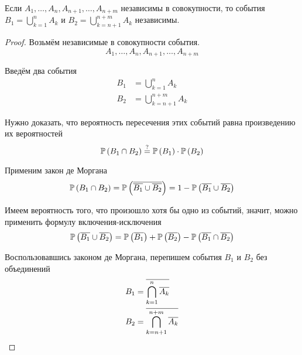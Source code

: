 \begin{affirmation}
    Если $A_1, \dots, A_n, A_{n+1}, \dots, A_{n+m}$ независимы в совокупности,
    то события
    $B_1=\bigcup_{k=1}^n A_k$ и $B_2=\bigcup_{k=n+1}^{n+m} A_k$ независимы.
\end{affirmation}
\begin{proof}
    Возьмём независимые в совокупности события.
    $$A_1, \dots, A_n, A_{n+1}, \dots, A_{n+m}$$
    
    Введём два события
    \begin{align*}
    B_1&=\bigcup_{k=1}^n A_k\\
    B_2&=\bigcup_{k=n+1}^{n+m} A_k
    \end{align*}

    Нужно доказать, что вероятность пересечения этих событий
    равна произведению их вероятностей
    \begin{equation}\label{eq:main_unions}
    \mathbb{P}\left( B_1\cap B_2 \right)
        \stackrel{\rm ?}{=}\mathbb{P}\left( B_1 \right)\cdot\mathbb{P}\left( B_2 \right)
    \end{equation}

    Применим закон де Моргана
    \begin{equation}\label{eq:de_morgan_result}
    \mathbb{P}\left( B_1\cap B_2 \right)
    =\mathbb{P}\left( \overline{\overline{B_1}\cup \overline{B_2}} \right)
    =1-\mathbb{P}\left( {\overline{B_1}\cup \overline{B_2}} \right)
    \end{equation}

    Имеем вероятность того, что произошло хотя бы одно из событий,
    значит, можно применить формулу включения-исключения
    \begin{equation}\label{eq:incl_excl_result}
    \mathbb{P}\left( \overline{B_1}\cup \overline{B_2} \right)
    =\mathbb{P}\left( \overline{B_1} \right)+\mathbb{P}\left( \overline{B_2} \right)
        -\mathbb{P}\left( \overline{B_1}\cap \overline{B_2} \right)
    \end{equation}

    Воспользовавшись законом де Моргана,
    перепишем события $B_1$ и $B_2$ без объединений
    \begin{align*}
    B_1&=\overline{\bigcap_{k=1}^n \overline{A_k}}\\
    B_2&=\overline{\bigcap_{k=n+1}^{n+m} \overline{A_k}}
    \end{align*}


\end{proof}
